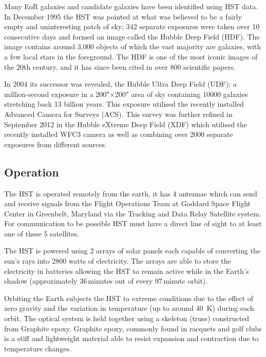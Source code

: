 		Many EoR galaxies and candidate galaxies have been identified using HST data. In December 1995 the HST was pointed at what was believed to be a fairly empty and uninteresting patch of sky; 342 separate exposures were taken over 10 consecutive days and formed an image called the Hubble Deep Field (HDF)\cite{ESA_2}. The image contains around 3,000 objects of which the vast majority are galaxies, with a few local stars in the foreground. The HDF is one of the most iconic images of the 20th century, and it has since been cited in over 800 scientific papers. 

		In 2004 its successor was revealed, the Hubble Ultra Deep Field (UDF); a million-second exposure in a 200\si{\arcsecond}$\times$200\si{\arcsecond} area of sky containing \num{10000} galaxies stretching back 13 billion years\cite{Hubsite_2}. This exposure utilised the recently installed Advanced Camera for Surveys (ACS). This survey was further refined in September 2012 in the Hubble eXtreme Deep Field (XDF) which utilised the recently installed WFC3 camera as well as combining over \num{2000} separate exposures from different sources\cite{ESA_2}.

	\subsection{Operation} %
		\label{ssub:operation}
		The HST is operated remotely from the earth, it has 4 antennae which can send and receive signals from the Flight Operations Team at Goddard Space Flight Center in Greenbelt, Maryland via the Tracking and Data Relay Satellite system. For communication to be possible HST must have a direct line of sight to at least one of these 5 satellites.

		The HST is powered using 2 arrays of solar panels each capable of converting the sun’s rays into \num{2800} watts of electricity. The arrays are able to store the electricity in batteries allowing the HST to remain active while in the Earth’s shadow (approximately 36\,minutes out of every 97\,minute orbit).

		Orbiting the Earth subjects the HST to extreme conditions due to the effect of zero gravity and the variation in temperature (up to around \SI{40}{\kelvin}) during each orbit. The optical system is held together using a skeleton (truss) constructed from Graphite epoxy. Graphite epoxy, commonly found in racquets and golf clubs is a stiff and lightweight material able to resist expansion and contraction due to temperature changes\cite{Hubsite_4}.

